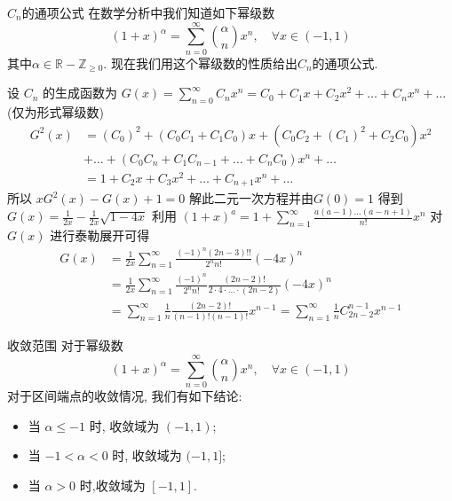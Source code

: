 \documentclass{beamer}
\theoremstyle{definition}
\newcommand{\bb}[1]{\mathbb{#1}}
\begin{document}
\begin{frame}{$C_n$的通项公式}
    在数学分析中我们知道如下幂级数
    \begin{equation*}
        (1+x)^\alpha=\sum_{n=0}^{\infty}\binom{\alpha}{n} x^n, \quad \forall x \in (-1,1)
    \end{equation*}
    其中$\alpha\in \bb{R}-\bb{Z}_{\ge 0}$.
    现在我们用这个幂级数的性质给出$C_n$的通项公式.
\end{frame}
\begin{frame}
    设 $C_n$ 的生成函数为 $G(x)=\sum_{n=0}^{\infty} C_n x^n=C_0+C_1 x+C_2 x^2+\ldots+C_n x^n+\ldots$(仅为形式幂级数)
    $$
        \begin{aligned}
            G^2(x) & =\left(C_0\right)^2+\left(C_0 C_1+C_1 C_0\right) x+\left(C_0 C_2+\left(C_1\right)^2+C_2 C_0\right) x^2 \\
                   & +\ldots+\left(C_0 C_n+C_1 C_{n-1}+\ldots+C_n C_0\right) x^n+\ldots                                     \\
                   & =1+C_2 x+C_3 x^2+\ldots+C_{n+1} x^n+\ldots
        \end{aligned}
    $$
    所以 $xG^2(x)-G(x)+1=0$
    解此二元一次方程并由$G(0)=1$
    得到$G(x)=\frac{1}{2 x}-\frac{1}{2 x} \sqrt{1-4 x}$
    利用 $(1+x)^a=1+\sum_{n=1}^{\infty} \frac{a(a-1) \ldots(a-n+1)}{n!} x^n$ 对 $G(x)$ 进行泰勒展开可得
    $$
        \begin{aligned}
            G(x) & =\frac{1}{2 x} \sum_{n=1}^{\infty} \frac{(-1)^n(2 n-3)!!}{2^n n!}(-4 x)^n                                                      \\
                 & =\frac{1}{2 x} \sum_{n=1}^{\infty} \frac{(-1)^n}{2^n n!} \frac{(2 n-2)!}{2 \cdot 4 \cdot \ldots \cdot(2 n-2)}(-4 x)^n          \\
                 & =\sum_{n=1}^{\infty} \frac{1}{n} \frac{(2 n-2)!}{(n-1)!(n-1)!} x^{n-1}=\sum_{n=1}^{\infty} \frac{1}{n} C_{2 n-2}^{n-1} x^{n-1}
        \end{aligned}
    $$
\end{frame}
\begin{frame}{收敛范围}
    对于幂级数
    \begin{equation*}
        (1+x)^\alpha=\sum_{n=0}^{\infty}\binom{\alpha}{n} x^n, \quad \forall x \in (-1,1)
    \end{equation*}
    对于区间端点的收敛情况, 我们有如下结论:
    \begin{itemize}
        \item  当 $\alpha \leqslant-1$ 时, 收敛域为 $(-1,1)$;
        \item 当 $-1<\alpha<0$ 时, 收敛域为 $(-1,1]$;
        \item 当 $\alpha>0$ 时,收敛域为 $[-1,1]$.
    \end{itemize}
\end{frame}
\end{document}
